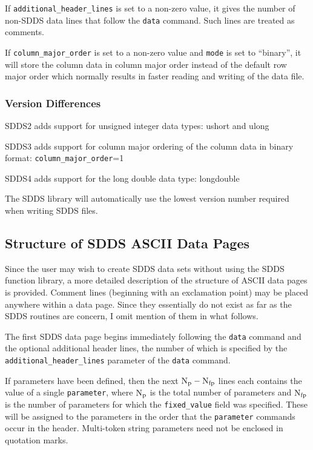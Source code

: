 \documentclass[11pt]{article}
\begin{document}
If {\tt additional\_header\_lines} is set to a non-zero value, it gives the number of non-SDDS data lines that follow the {\tt data} command.  Such lines are treated as comments.

If {\tt column\_major\_order} is set to a non-zero value and {\tt mode} is set to ``binary'', it will store the column data in column major order instead of the default row major order which normally results in faster reading and writing of the data file.

\subsubsection{Version Differences}

SDDS2 adds support for unsigned integer data types: ushort and ulong

SDDS3 adds support for column major ordering of the column data in binary format: {\tt column\_major\_order}=1

SDDS4 adds support for the long double data type: longdouble

The SDDS library will automatically use the lowest version number required when writing SDDS files.

\subsection{Structure of SDDS ASCII Data Pages}

Since the user may wish to create SDDS data sets without using the SDDS function library, a more detailed description of the structure of ASCII data pages is provided.  Comment lines (beginning with an exclamation point) may be placed anywhere within a data page.  Since they essentially do not exist as far as the SDDS routines are concern, I omit mention of them in what follows.

The first SDDS data page begins immediately following the {\tt data} command and the optional additional header lines, the number of which is specified by the \verb|additional_header_lines| parameter of the {\tt data} command.

If parameters have been defined, then the next ${\rm N_p-N_{fp}}$ lines each contains the value of a single {\tt parameter}, where ${\rm N_p}$ is the total number of parameters and ${\rm N_{fp}}$ is the number of parameters for which the \verb|fixed_value| field was specified.  These will be assigned to the parameters in the order that the \verb|parameter| commands occur in the header.  Multi-token string parameters need not be enclosed in quotation marks.
\end{document}
